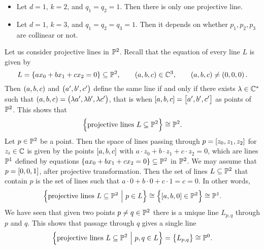 \begin{example*}
\hfill
\begin{itemize}
\item Let $ d = 1 $, $ k = 2 $, and $ q_1 = q_2 = 1 $. Then there is only one projective line.
\item Let $ d = 1 $, $ k = 3 $, and $ q_1 = q_2 = q_3 = 1 $. Then it depends on whether $ p_1, p_2, p_3 $ are collinear or not.
\end{itemize}
\end{example*}

\begin{example}
Let us consider projective lines in $ \mathbb{P}^2 $. Recall that the equation of every line $ L $ is given by
$$ L = \cbr{ax_0 + bx_1 + cx_2 = 0} \subseteq \PP^2, \qquad \br{a, b, c} \in \CC^3, \qquad \br{a, b, c} \ne \br{0, 0, 0}. $$
Then $ \br{a, b, c} $ and $ \br{a', b', c'} $ define the same line if and only if there exists $ \lambda \in \mathbb{C}^* $ such that $ \br{a, b, c} = \br{\lambda a', \lambda b', \lambda c'} $, that is when $ \sbr{a, b, c} = \sbr{a', b', c'} $ as points of $ \mathbb{P}^2 $. This shows that
$$ \cbr{\text{projective lines} \ L \subseteq \PP^2} \cong \PP^2. $$
Let $ p \in \mathbb{P}^2 $ be a point. Then the space of lines passing through $ p = \sbr{z_0, z_1, z_2} $ for $ z_i \in \mathbb{C} $ is given by the points $ \sbr{a, b, c} $ with $ a \cdot z_0 + b \cdot z_1 + c \cdot z_2 = 0 $, which are lines $ \mathbb{P}^1 $ defined by equations $ \cbr{ax_0 + bx_1 + cx_2 = 0} \subseteq \PP^2 $ in $ \mathbb{P}^2 $. We may assume that $ p = \sbr{0, 0, 1} $, after projective transformation. Then the set of lines $ L \subseteq \mathbb{P}^2 $ that contain $ p $ is the set of lines such that $ a \cdot 0 + b \cdot 0 + c \cdot 1 = c = 0 $. In other words,
$$ \cbr{\text{projective lines} \ L \subseteq \PP^2 \st p \in L} \cong \cbr{\sbr{a, b, 0} \in \PP^2} \cong \PP^1. $$
We have seen that given two points $ p \ne q \in \mathbb{P}^2 $ there is a unique line $ L_{p, q} $ through $ p $ and $ q $. This shows that passage through $ q $ gives a single line
$$ \cbr{\text{projective lines} \ L \subseteq \PP^2 \st p, q \in L} = \cbr{L_{p, q}} \cong \PP^0. $$
\end{example}

